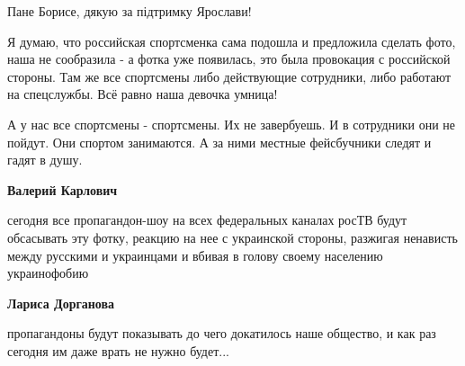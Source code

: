 \begin{itemize}
Пане Борисе, дякую за підтримку Ярослави!

 

Я думаю, что российская спортсменка сама подошла и предложила сделать фото,
наша не сообразила - а фотка уже появилась, это была провокация с российской
стороны. Там же все спортсмены либо действующие сотрудники, либо работают на
спецслужбы. Всё равно наша девочка умница!

\begin{itemize}
 

А у нас все спортсмены - спортсмены. Их не завербуешь. И в сотрудники они не
пойдут. Они спортом занимаются. А за ними местные фейсбучники следят и гадят в
душу.


 
\textbf{Валерий Карлович} 

сегодня все пропагандон-шоу на всех федеральных каналах росТВ будут обсасывать
эту фотку, реакцию на нее с украинской стороны, разжигая ненависть между
русскими и украинцами и вбивая в голову своему населению украинофобию


 
\textbf{Лариса Дорганова} 

пропагандоны будут показывать до чего докатилось наше общество, и как раз
сегодня им даже врать не нужно будет...


 

\end{itemize}
\end{itemize}
